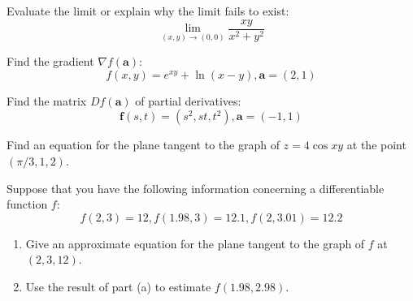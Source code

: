 \documentclass[12pt,letterpaper]{hmcpset}
\newcommand{\vb}{\mathbf}
\begin{document}

\begin{problem}[Colley 2.2.14]
  Evaluate the limit or explain why the limit fails to exist:
  \[ \lim_{(x,y) \to (0,0)} \frac{xy}{x^2 + y^2} \]
\end{problem}
\clearpage
\begin{problem}[Colley 2.3.22]
  Find the gradient $\nabla  f(\vb a)$:
  \[ f(x,y) =  e^{xy} + \ln(x-y), \vb a=(2, 1) \]
\end{problem}
\clearpage

\begin{problem}[Colley 2.3.33]
  Find the matrix $Df(\vb a)$ of partial derivatives:
  \[\vb f(s, t) = (s^2, st, t^2), \vb a = (-1, 1) \]
\end{problem}
\clearpage

\begin{problem}[Colley 2.3.38]
  Find an equation for the plane tangent to the graph of $z = 4\cos x y$ at the point $(\pi /3, 1, 2)$.
\end{problem}
\clearpage

\begin{problem}[Colley 2.3.42]
  Suppose that you have the following information concerning a differentiable function $f$:
  \[ f(2,3) = 12, f(1.98,3) = 12.1, f(2,3.01) = 12.2\]
  \begin{enumerate}[label=(\alph*)]
  \item Give an approximate equation for the plane tangent to the graph of $f$ at $(2,3,12)$.
  \item Use the result of part (a) to estimate $f(1.98, 2.98)$.
  \end{enumerate}
\end{problem}
\clearpage
\end{document}
